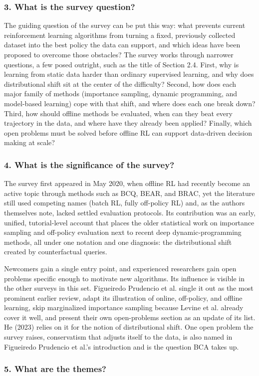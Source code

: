 \documentclass[11pt]{article}
\newcommand{\question}[1]{\subsubsection*{#1}}
\begin{document}
\question{3. What is the survey question?}

The guiding question of the survey can be put this way: what prevents current reinforcement learning algorithms from turning a fixed, previously collected dataset into the best policy the data can support, and which ideas have been proposed to overcome those obstacles? The survey works through narrower questions, a few posed outright, such as the title of Section 2.4. First, why is learning from static data harder than ordinary supervised learning, and why does distributional shift sit at the center of the difficulty? Second, how does each major family of methods (importance sampling, dynamic programming, and model-based learning) cope with that shift, and where does each one break down? Third, how should offline methods be evaluated, when can they beat every trajectory in the data, and where have they already been applied? Finally, which open problems must be solved before offline RL can support data-driven decision making at scale?

\question{4. What is the significance of the survey?}

The survey first appeared in May 2020, when offline RL had recently become an active topic through methods such as BCQ, BEAR, and BRAC, yet the literature still used competing names (batch RL, fully off-policy RL) and, as the authors themselves note, lacked settled evaluation protocols. Its contribution was an early, unified, tutorial-level account that places the older statistical work on importance sampling and off-policy evaluation next to recent deep dynamic-programming methods, all under one notation and one diagnosis: the distributional shift created by counterfactual queries.

Newcomers gain a single entry point, and experienced researchers gain open problems specific enough to motivate new algorithms. Its influence is visible in the other surveys in this set. Figueiredo Prudencio et al. single it out as the most prominent earlier review, adapt its illustration of online, off-policy, and offline learning, skip marginalized importance sampling because Levine et al. already cover it well, and present their own open-problems section as an update of its list. He (2023) relies on it for the notion of distributional shift. One open problem the survey raises, conservatism that adjusts itself to the data, is also named in Figueiredo Prudencio et al.'s introduction and is the question BCA takes up.

\question{5. What are the themes?}
\end{document}

